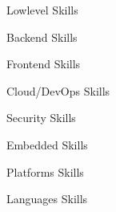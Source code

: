 

\begin{cvskills}

  \cvskill
    {Lowlevel} %
    {Skills} %

  \cvskill
    {Backend} %
    {Skills} %

  \cvskill
    {Frontend} %
    {Skills} %

  \cvskill
    {Cloud/DevOps} %
    {Skills} %

  \cvskill
    {Security} %
    {Skills} %

  \cvskill
    {Embedded} %
    {Skills} %

  \cvskill
    {Platforms} %
    {Skills} %

  \cvskill
    {Languages} %
    {Skills} %

\end{cvskills}
